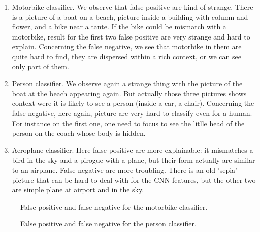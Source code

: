 \documentclass[a4paper,11pt]{exam}
\begin{document}
\begin{enumerate}
\item Motorbike classifier. We observe that false positive are kind of strange. There is a picture of a boat on a beach, picture inside a building with column and flower, and a bike near a tante. If the bike could be mismatch with a motorbike, result for the first two false positive are very strange and hard to explain. Concerning the false negative, we see that motorbike in them are quite hard to find, they are dispersed within a rich context, or we can see only part of them.
\item Person classifier. We observe again a strange thing with the picture of the boat at the beach appearing again. But actually those three pictures shows context were it is likely to see a person (inside a car, a chair). Concerning the false negative, here again, picture are very hard to classify even for a human. For instance on the first one, one need to focus to see the litlle head of the person on the coach whose body is hidden.
\item Aeroplane classifier. Here false positive are more explainable: it mismatches a bird in the sky and a pirogue with a plane, but their form actually are similar to an airplane. False negative are more troubling. There is an old 'sepia' picture that can be hard to deal with for the CNN features, but the other two are simple plane at airport and in the sky.
\end{enumerate}



\begin{figure}[!h]%
    \centering
    \qquad
    \caption{False positive and false negative for the motorbike classifier.}%
    \label{motorbad}%
\end{figure}


\begin{figure}[!h]%
    \centering
    \qquad
    \caption{False positive and false negative for the person classifier.}%
    \label{personbad}%
\end{figure}
\end{document}
